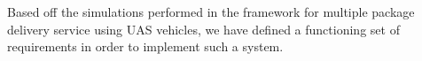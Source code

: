 Based off the simulations performed in the framework for multiple package delivery service using UAS vehicles, we have defined a functioning set of requirements in order to implement such a system.